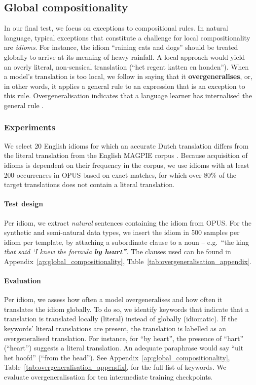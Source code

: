 \subsection{Global compositionality}
\label{subsec:global_compositionality}

In our final test, we focus on exceptions to compositional rules.
In natural language, typical exceptions that constitute a challenge for local compositionality are \emph{idioms}.
For instance, the idiom ``raining cats and dogs'' should be treated globally to arrive at its meaning of heavy rainfall.
A local approach would yield an overly literal, non-sensical translation (``het regent katten en honden'').
When a model's translation is too local, we follow \citet{hupkes2020compositionality} in saying that it \textbf{overgeneralises}, or, in other words, it applies a general rule to an expression that is an exception to this rule.
Overgeneralisation indicates that a language learner has internalised the general rule \citep[e.g.][]{penke2012dual}.

\subsubsection{Experiments}
We select 20 English idioms for which an accurate Dutch translation differs from the literal translation from the English MAGPIE corpus \citep{haagsma2020magpie}.
Because acquisition of idioms is dependent on their frequency in the corpus, we use idioms with at least 200 occurrences in OPUS based on exact matches, for which over 80\% of the target translations does not contain a literal translation.

\paragraph{Test design}
Per idiom, we extract \textit{natural} sentences containing the idiom from OPUS. 
For the synthetic and semi-natural data types, we insert the idiom in 500 samples per idiom per template, by attaching a subordinate clause to a noun -- e.g.\ ``the king \emph{that said `I knew the formula \textbf{by heart}'}''. 
The clauses used can be found in Appendix~\ref{ap:global_compositionality}, Table~\ref{tab:overgeneralisation_appendix}.

\paragraph{Evaluation}
Per idiom, we assess how often a model overgeneralises and how often it translates the idiom globally. 
To do so, we identify keywords that indicate that a translation is translated locally (literal) instead of globally (idiomatic).
If the keywords' literal translations are present, the translation is labelled as an overgeneralised translation. 
For instance, for ``by heart'', the presence of ``hart'' (``heart'') suggests a literal translation. An adequate paraphrase would say ``uit het hoofd'' (``from the head'').
See Appendix~\ref{ap:global_compositionality}, Table~\ref{tab:overgeneralisation_appendix}, for the full list of keywords.
We evaluate overgeneralisation for ten intermediate training checkpoints.

